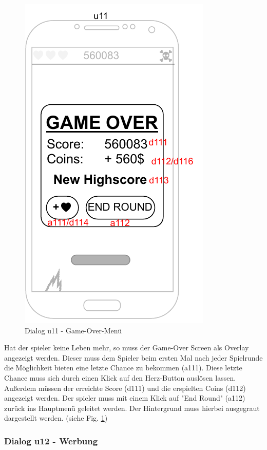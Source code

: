 \begin{figure}[h!]
    \begin{center}
    \includegraphics[scale=1.4]{diagramme/pdf/Mockup-u11.pdf}
    \end{center}
    \caption{Dialog u11 - Game-Over-Menü}\label{fig:dia:u11}
\end{figure}

Hat der \gls{spieler} keine Leben mehr, so muss der Game-Over Screen als Overlay angezeigt werden. Dieser muss dem Spieler beim ersten Mal nach jeder Spielrunde die Möglichkeit bieten eine letzte Chance zu bekommen (a111).
Diese letzte Chance muss sich durch einen Klick auf den Herz-Button auslösen lassen.
Außerdem müssen der erreichte Score (d111) und die erspielten Coins (d112) angezeigt werden.
Der \gls{spieler} muss mit einem Klick auf "End Round" (a112) zurück ins Hauptmenü geleitet werden.
Der Hintergrund muss hierbei ausgegraut dargestellt werden. 
(siehe Fig. \ref{fig:dia:u11})
\clearpage

\subsubsection{Dialog u12 - Werbung}\label{dialog:Werbung}

